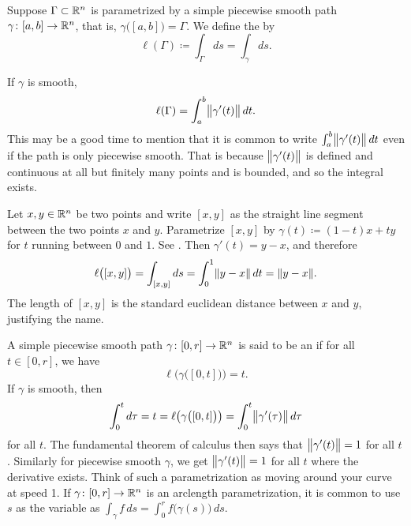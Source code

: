 \begin{defn}
Suppose $\Gamma \subset {\mathbb{R}}^n$ is parametrized by a simple
piecewise smooth path $\gamma \colon [a,b] \to {\mathbb{R}}^n$, that is,
$\gamma\bigl( [a,b] \bigr) = \Gamma$.  We define the
\emph{} by
\begin{equation*}
\ell(\Gamma) \coloneqq \int_{\Gamma} ds = \int_{\gamma} ds .
\end{equation*}
\end{defn}

If $\gamma$ is smooth,
\begin{equation*}
\ell(\Gamma) = 
\int_a^b
\bigl\lVert {\gamma'(t)} \bigr\rVert\, dt .
\end{equation*}
This may be a good time to mention that it is common to write
$\int_a^b
\bigl\lVert {\gamma'(t)} \bigr\rVert\, dt$ even if the path is only piecewise smooth.
That is because $\bigl\lVert {\gamma'(t)} \bigr\rVert$ is defined and continuous
at all but finitely many points and is bounded, and so the integral exists.

\begin{example}
Let $x,y \in {\mathbb{R}}^n$ be two points and write $[x,y]$ as the straight line
segment between the two points $x$ and $y$.  Parametrize
$[x,y]$ by $\gamma(t) \coloneqq (1-t)x + ty$ for $t$ running between $0$ and $1$.
See .
Then $\gamma'(t) = y-x$, and therefore
\begin{equation*}
\ell\bigl([x,y]\bigr)
=
\int_{[x,y]} ds
=
\int_0^1 \lVert {y-x} \rVert \, dt
=
\lVert {y-x} \rVert .
\end{equation*}
The length of $[x,y]$ is the standard euclidean distance between $x$ and $y$,
justifying the name.
\begin{myfigureht}
\caption{Straight path between $x$ and $y$ parametrized
by $(1-t)x + ty$.\label{fig:straightpath}}
\end{myfigureht}
\end{example}

A simple piecewise smooth path $\gamma \colon [0,r] \to {\mathbb{R}}^n$ is
said to be an \emph{} if
for all $t \in [0,r]$, we have
\begin{equation*}
\ell\bigl( \gamma\bigl([0,t]\bigr) \bigr) = t .
\end{equation*}
If $\gamma$ is smooth, then
\begin{equation*}
\int_0^t d\tau =
t = \ell\bigl( \gamma\bigl([0,t]\bigr) \bigr) =
\int_0^t
\bigl\lVert {\gamma'(\tau)} \bigr\rVert
\, d\tau
\end{equation*}
for all $t$.
The fundamental theorem of calculus then says
that $\bigl\lVert {\gamma'(t)} \bigr\rVert = 1$ for all $t$.
Similarly for piecewise smooth $\gamma$, we get
$\bigl\lVert {\gamma'(t)} \bigr\rVert = 1$ for all $t$ where the derivative exists.
Think of such a parametrization as moving around your curve at speed
1.  If $\gamma \colon [0,r] \to {\mathbb{R}}^n$ is an arclength parametrization, it is
common to use $s$ as the variable as $\int_\gamma f \,ds
= \int_0^r f\bigl(\gamma(s)\bigr) \,ds$.

